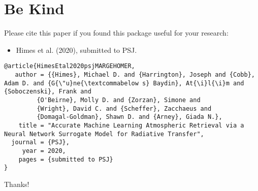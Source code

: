 \documentclass[letterpaper, 12pt]{article}
\begin{document}
\section{Be Kind}
\label{sec:bekind}
Please cite this paper if you found this package useful for your
research:

\begin{itemize}
\item Himes et al. (2020), submitted to PSJ.
\end{itemize}

\begin{verbatim}
@article{HimesEtal2020psjMARGEHOMER,
   author = {{Himes}, Michael D. and {Harrington}, Joseph and {Cobb}, Adam D. and {G{\"u}ne{\textcommabelow s} Baydin}, At{\i}l{\i}m and {Soboczenski}, Frank and
         {O'Beirne}, Molly D. and {Zorzan}, Simone and
         {Wright}, David C. and {Scheffer}, Zacchaeus and
         {Domagal-Goldman}, Shawn D. and {Arney}, Giada N.},
    title = "Accurate Machine Learning Atmospheric Retrieval via a Neural Network Surrogate Model for Radiative Transfer",
  journal = {PSJ},
     year = 2020,
    pages = {submitted to PSJ}
}
\end{verbatim}

\noindent Thanks!


\end{document}
